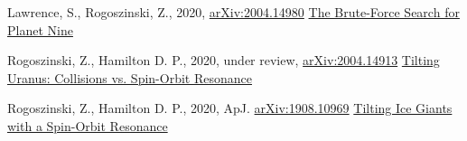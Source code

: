 \documentclass[]{awesome-cv}
\begin{document}
\vspace{-0mm}
\begin{cventries}
	\cventry
	{Lawrence, S., Rogoszinski, Z., 2020, \href{https://arxiv.org/pdf/2004.14980.pdf}{arXiv:2004.14980}}
	{\href{https://ui.adsabs.harvard.edu/abs/2020arXiv200414980L/abstract}{The Brute-Force Search for Planet Nine}}
	{}
	{}
	{}
	
	\vspace{-5mm}
	\cventry
	{Rogoszinski, Z., Hamilton D. P., 2020, under review, \href{https://arxiv.org/pdf/2004.14913.pdf}{arXiv:2004.14913}}
	{\href{https://ui.adsabs.harvard.edu/abs/2020arXiv200414913R/abstract}{Tilting Uranus: Collisions vs. Spin-Orbit Resonance}}
	{}
	{}
	{}
	
	
	\vspace{-5mm}
	\cventry
	{Rogoszinski, Z., Hamilton D. P., 2020, ApJ. \href{https://arxiv.org/pdf/1908.10969.pdf}{arXiv:1908.10969}}
	{\href{https://ui.adsabs.harvard.edu/abs/2020ApJ...888...60R/abstract}{Tilting Ice Giants with a Spin-Orbit Resonance}}
	{}
	{}
	{}
	
	\vspace{-5mm}
\end{cventries}
\end{document}
